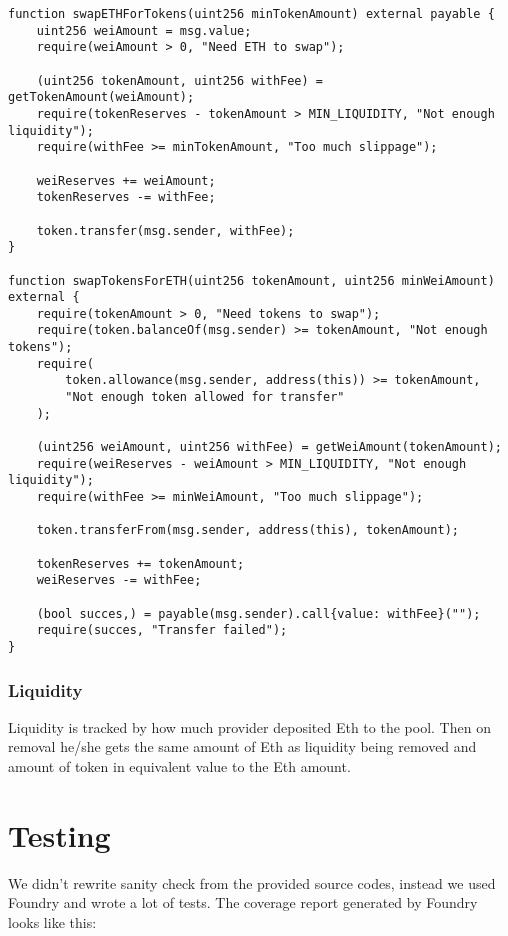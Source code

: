 \documentclass[11pt,a4paper]{article}
\begin{document}
\begin{verbatim}
function swapETHForTokens(uint256 minTokenAmount) external payable {
    uint256 weiAmount = msg.value;
    require(weiAmount > 0, "Need ETH to swap");

    (uint256 tokenAmount, uint256 withFee) = getTokenAmount(weiAmount);
    require(tokenReserves - tokenAmount > MIN_LIQUIDITY, "Not enough liquidity");
    require(withFee >= minTokenAmount, "Too much slippage");

    weiReserves += weiAmount;
    tokenReserves -= withFee;

    token.transfer(msg.sender, withFee);
}

function swapTokensForETH(uint256 tokenAmount, uint256 minWeiAmount) external {
    require(tokenAmount > 0, "Need tokens to swap");
    require(token.balanceOf(msg.sender) >= tokenAmount, "Not enough tokens");
    require(
        token.allowance(msg.sender, address(this)) >= tokenAmount,
        "Not enough token allowed for transfer"
    );

    (uint256 weiAmount, uint256 withFee) = getWeiAmount(tokenAmount);
    require(weiReserves - weiAmount > MIN_LIQUIDITY, "Not enough liquidity");
    require(withFee >= minWeiAmount, "Too much slippage");

    token.transferFrom(msg.sender, address(this), tokenAmount);

    tokenReserves += tokenAmount;
    weiReserves -= withFee;

    (bool succes,) = payable(msg.sender).call{value: withFee}("");
    require(succes, "Transfer failed");
}
\end{verbatim}

\subsubsection*{Liquidity}

Liquidity is tracked by how much provider deposited Eth to the pool. Then
on removal he/she gets the same amount of Eth as liquidity being removed
and amount of token in equivalent value to the Eth amount.

\section{Testing}

We didn't rewrite sanity check from the provided source codes, instead we used
Foundry and wrote a lot of tests. The coverage report generated by Foundry
looks like this:
\end{document}
